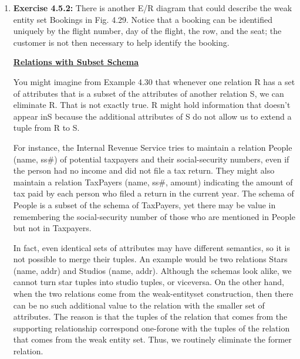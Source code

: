 \documentclass[12pt]{article}
\begin{document}
\begin{enumerate}[1.]
    \item \textbf{Exercise 4.5.2:} There is another E/R diagram that could describe the weak
    entity set Bookings in Fig. 4.29. Notice that a booking can be identified uniquely
    by the flight number, day of the flight, the row, and the seat; the customer is
    not then necessary to help identify the booking.

    \bigskip

    \begin{mdframed}
        \underline{\textbf{Relations with Subset Schema}}

        \bigskip

        You might imagine from Example 4.30 that whenever one relation R has a
        set of attributes that is a subset of the attributes of another relation S, we
        can eliminate R. That is not exactly true. R might hold information that
        doesn't appear inS because the additional attributes of S do not allow us
        to extend a tuple from R to S.

        \bigskip

        For instance, the Internal Revenue Service tries to maintain a relation
        People (name, ss\#) of potential taxpayers and their social-security numbers,
        even if the person had no income and did not file a tax return. They
        might also maintain a relation TaxPayers (name, ss\#, amount) indicating
        the amount of tax paid by each person who filed a return in the current
        year. The schema of People is a subset of the schema of TaxPayers, yet
        there may be value in remembering the social-security number of those
        who are mentioned in People but not in Taxpayers.

        \bigskip

        In fact, even identical sets of attributes may have different semantics,
        so it is not possible to merge their tuples. An example would be two
        relations Stars (name, addr) and Studios (name, addr). Although the
        schemas look alike, we cannot turn star tuples into studio tuples, or viceversa.
        On the other hand, when the two relations come from the weak-entityset
        construction, then there can be no such additional value to the relation
        with the smaller set of attributes. The reason is that the tuples of the
        relation that comes from the supporting relationship correspond one-forone
        with the tuples of the relation that comes from the weak entity set.
        Thus, we routinely eliminate the former relation.
    \end{mdframed}


\end{enumerate}
\end{document}

